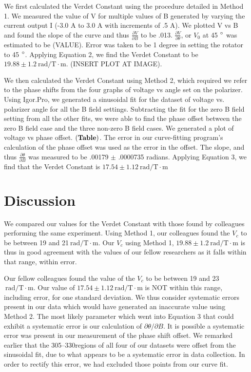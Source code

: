 \documentclass[prb,preprint]{revtex4-1}
\begin{document}
{{We first calculated the Verdet Constant using the procedure detailed in Method 1.  We measured the value of V for multiple values of B generated by varying the current output I (-3.0 A to 3.0 A with increments of .5 A).  We plotted V vs B and found the slope of the curve and thus $\frac{\partial V}{\partial B}$ to be .013.  $\frac{\partial V}{\partial \theta}$, or $V_{0}$ at 45 $\degree$ was estimated to be (VALUE).  Error was taken to be 1 degree in setting the rotator to 45 $\degree$.  Applying Equation 2, we find the Verdet Constant to be $19.88 \pm 1.2 \mathrm{~rad/T} \cdot \textrm{m}$. (INSERT PLOT AT IMAGE).
{We then calculated the Verdet Constant using Method 2, which required we refer to the phase shifts from the four graphs of voltage vs angle set on the polarizer.  Using Igor.Pro, we generated a sinusoidal fit for the dataset of voltage vs. polarizer angle for all the B field settings.  Subtracting the fit for the zero B field setting from all the other fits, we were able to find the phase offset between the zero B field case and the three non-zero B field cases.  We generated a plot of voltage vs phase offset.  $\bf (Table)$.  The error in our curve-fitting program's calculation of the phase offset was used as the error in the offset.  The slope, and thus $\frac{\partial \theta}{\partial B}$ was measured to be .00179 $\pm$ .0000735 radians.  Applying Equation 3, we find that the Verdet Constant is $17.54 \pm 1.12 \mathrm{~rad/T} \cdot \textrm{m}$


\section{Discussion}

{We compared our values for the Verdet Constant with those found by colleagues performing the same experiment.  Using Method 1, our colleagues found the $V_{c}$ to be between 19 and 21$\mathrm{~rad/T} \cdot \textrm{m}$.  Our $V_{c}$ using Method 1, $19.88 \pm 1.2 \mathrm{~rad/T} \cdot \textrm{m}$ is thus in good agreement with the values of our fellow researchers as it falls within that range, within error.

{Our fellow colleagues found the value of the $V_{c}$ to be between 19 and 23 $\mathrm{~rad/T} \cdot \textrm{m}$.  Our value of $17.54 \pm 1.12 \mathrm{~rad/T} \cdot \textrm{m}$ is NOT within this range, including error, for one standard deviation.  We thus consider systematic errors present in our data which would have generated an inaccurate value using Method 2.  The most likely parameter which went into Equation 3 that could exhibit a systematic error is our calculation of $\partial \theta/\partial B$.  It is possible a systematic error was present in our measurement of the phase shift offset.  We remarked earlier that the 305\degree--330\degree regions of all four of our datasets were offset from the sinusoidal fit, due to what appears to be a systematic error in data collection.  In order to rectify this error, we had excluded those points from our curve fit. 

}}}}}
\end{document}
